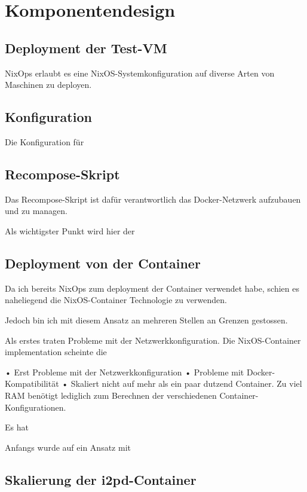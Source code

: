 \section{Komponentendesign}

\subsection{Deployment der Test-VM}

NixOps erlaubt es eine NixOS-Systemkonfiguration auf diverse Arten von Maschinen zu deployen.

\subsection{Konfiguration}

Die Konfiguration für

\subsection{Recompose-Skript}

Das Recompose-Skript ist dafür verantwortlich das Docker-Netzwerk aufzubauen und zu managen.

Als wichtigster Punkt wird hier der 



\subsection{Deployment von der Container}

Da ich bereits NixOps zum deployment der Container verwendet habe, schien es naheliegend die NixOS-Container Technologie zu verwenden.

Jedoch bin ich mit diesem Ansatz an mehreren Stellen an Grenzen gestossen.

Als erstes traten Probleme mit der Netzwerkkonfiguration. Die NixOS-Container implementation scheinte die 

• Erst Probleme mit der Netzwerkkonfiguration
• Probleme mit Docker-Kompatibilität
• Skaliert nicht auf mehr als ein paar dutzend Container. Zu viel
RAM benötigt lediglich zum Berechnen der verschiedenen
Container-Konfigurationen.

Es hat 

Anfangs wurde auf ein Ansatz mit 


\subsection{Skalierung der i2pd-Container}

